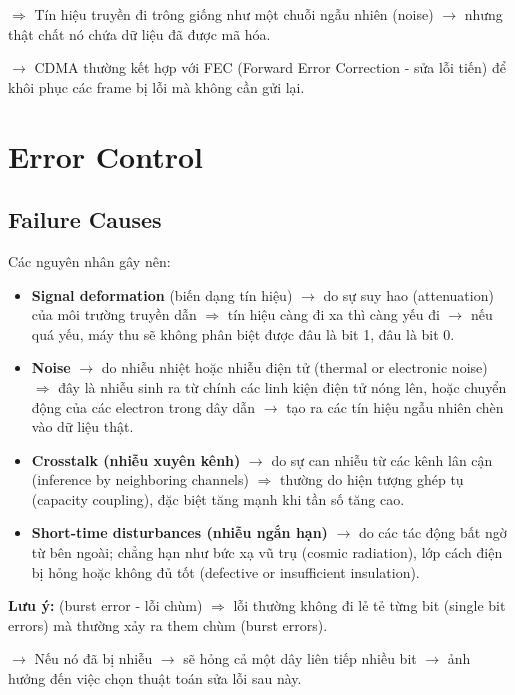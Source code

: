 \noindent
$\Rightarrow$ Tín hiệu truyền đi trông giống như một chuỗi ngẫu nhiên (noise) $\rightarrow$ nhưng thật chất nó chứa dữ liệu đã được mã hóa.
\medskip

\noindent
$\rightarrow$ CDMA thường kết hợp với FEC (Forward Error Correction - sửa lỗi tiến) để khôi phục các frame bị lỗi mà không cần gửi lại.
\medskip

\section{Error Control}

\subsection{Failure Causes}

\noindent
Các nguyên nhân gây nên:

\begin{itemize}
    \item \textbf{Signal deformation} (biến dạng tín hiệu) $\rightarrow$ do sự suy hao (attenuation) của môi trường truyền dẫn $\Rightarrow$ tín hiệu càng đi xa thì càng yếu đi $\rightarrow$ nếu quá yếu, máy thu sẽ không phân biệt được đâu là bit 1, đâu là bit 0.
    \item \textbf{Noise} $\rightarrow$ do nhiễu nhiệt hoặc nhiễu điện tử (thermal or electronic noise) $\Rightarrow$ đây là nhiễu sinh ra từ chính các linh kiện điện tử nóng lên, hoặc chuyển động của các electron trong dây dẫn $\rightarrow$ tạo ra các tín hiệu ngẫu nhiên chèn vào dữ liệu thật.
    \item \textbf{Crosstalk (nhiễu xuyên kênh)} $\rightarrow$ do sự can nhiễu từ các kênh lân cận (inference by neighboring channels) $\Rightarrow$ thường do hiện tượng ghép tụ (capacity coupling), đặc biệt tăng mạnh khi tần số tăng cao.
    \item \textbf{Short-time disturbances (nhiễu ngắn hạn)} $\rightarrow$ do các tác động bất ngờ từ bên ngoài; chẳng hạn như bức xạ vũ trụ (cosmic radiation), lớp cách điện bị hỏng hoặc không đủ tốt (defective or insufficient insulation).
\end{itemize}
\medskip

\noindent
\textbf{Lưu ý:} (burst error - lỗi chùm) $\Rightarrow$ lỗi thường không đi lẻ tẻ từng bit (single bit errors) mà thường xảy ra them chùm (burst errors).

$\rightarrow$ Nếu nó đã bị nhiễu $\rightarrow$ sẽ hỏng cả một dây liên tiếp nhiều bit $\rightarrow$ ảnh hưởng đến việc chọn thuật toán sửa lỗi sau này.
\medskip
